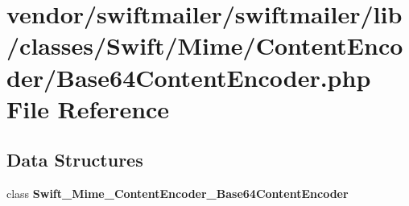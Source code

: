 \section{vendor/swiftmailer/swiftmailer/lib/classes/\+Swift/\+Mime/\+Content\+Encoder/\+Base64\+Content\+Encoder.php File Reference}
\label{_base64_content_encoder_8php}
\subsection*{Data Structures}
\begin{DoxyCompactItemize}
\item 
class {\bf Swift\+\_\+\+Mime\+\_\+\+Content\+Encoder\+\_\+\+Base64\+Content\+Encoder}
\end{DoxyCompactItemize}
